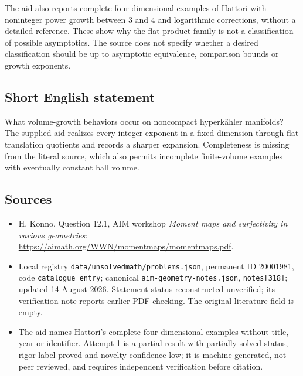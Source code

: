 \documentclass[11pt]{article}
\begin{document}
The aid also reports complete four-dimensional examples of Hattori with noninteger power growth between 3 and 4 and logarithmic corrections, without a detailed reference. These show why the flat product family is not a classification of possible asymptotics. The source does not specify whether a desired classification should be up to asymptotic equivalence, comparison bounds or growth exponents.
\subsection{Short English statement}
What volume-growth behaviors occur on noncompact hyperk\"ahler manifolds? The supplied aid realizes every integer exponent in a fixed dimension through flat translation quotients and records a sharper expansion. Completeness is missing from the literal source, which also permits incomplete finite-volume examples with eventually constant ball volume.
\subsection{Sources}
\begin{itemize}
\item H. Konno, Question 12.1, AIM workshop \emph{Moment maps and surjectivity in various geometries}: \url{https://aimath.org/WWN/momentmaps/momentmaps.pdf}.
\item Local registry \texttt{data/unsolvedmath/problems.json}, permanent ID 20001981, code \texttt{catalogue entry}; canonical \texttt{aim-geometry-notes.json}, \texttt{notes[318]}; updated 14 August 2026. Statement status reconstructed unverified; its verification note reports earlier PDF checking. The original literature field is empty.
\item The aid names Hattori's complete four-dimensional examples without title, year or identifier. Attempt 1 is a partial result with partially solved status, rigor label proved and novelty confidence low; it is machine generated, not peer reviewed, and requires independent verification before citation.
\end{itemize}
\end{document}
